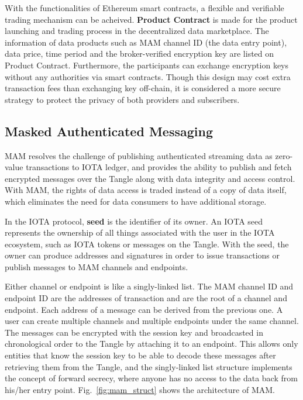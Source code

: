 \documentclass[conference]{IEEEtran}
\begin{document}
With the functionalities of Ethereum smart contracts, a flexible and verifiable trading mechanism can be acheived. \textbf{Product Contract} is made for the product launching and trading process in the decentralized data marketplace. The information of data products such as MAM channel ID (the data entry point), data price, time period and the broker-verified encryption key are listed on Product Contract. Furthermore, the participants can exchange encryption keys without any authorities via smart contracts. Though this design may cost extra transaction fees than exchanging key off-chain, it is considered a more secure strategy to protect the privacy of both providers and subscribers.

\subsection{Masked Authenticated Messaging}
MAM resolves the challenge of publishing authenticated streaming data as zero-value transactions to IOTA ledger, and provides the ability to publish and fetch encrypted messages over the Tangle along with data integrity and access control. With MAM, the rights of data access is traded instead of a copy of data itself, which eliminates the need for data consumers to have additional storage.
 
In the IOTA protocol, \textbf{seed} is the identifier of its owner. An IOTA seed represents the ownership of all things associated with the user in the IOTA ecosystem, such as IOTA tokens or messages on the Tangle. With the seed, the owner can produce addresses and signatures in order to issue transactions or publish messages to MAM channels and endpoints.

Either channel or endpoint is like a singly-linked list. The MAM channel ID and endpoint ID are the addresses of transaction and are the root of a channel and endpoint. Each address of a message can be derived from the previous one. A user can create multiple channels and multiple endpoints under the same channel. The messages can be encrypted with the session key and broadcasted in chronological order to the Tangle by attaching it to an endpoint. This allows only entities that know the session key to be able to decode these messages after retrieving them from the Tangle, and the singly-linked list structure implements the concept of forward secrecy, where anyone has no access to the data back from his/her entry point. Fig.~\ref{fig:mam_struct} shows the architecture of MAM.
\end{document}
